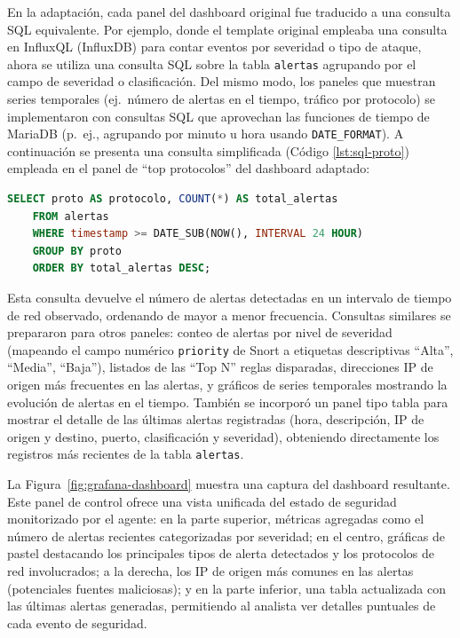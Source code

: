 \documentclass[11pt,a4paper,twoside]{report}
\begin{document}
En la adaptación, cada panel del dashboard original fue traducido a una consulta SQL equivalente. Por ejemplo, donde el template original empleaba una consulta en InfluxQL (InfluxDB) para contar eventos por severidad o tipo de ataque, ahora se utiliza una consulta SQL sobre la tabla \texttt{alertas} agrupando por el campo de severidad o clasificación. Del mismo modo, los paneles que muestran series temporales (ej.~número de alertas en el tiempo, tráfico por protocolo) se implementaron con consultas SQL que aprovechan las funciones de tiempo de MariaDB (p.~ej., agrupando por minuto u hora usando \texttt{DATE\_FORMAT}). A continuación se presenta una consulta simplificada (Código \ref{lst:sql-proto}) empleada en el panel de “top protocolos” del dashboard adaptado:

\begin{lstlisting}[language=SQL, caption={Consulta SQL (simplificada) para panel de protocolos en Grafana.}, label={lst:sql-proto}]
	SELECT proto AS protocolo, COUNT(*) AS total_alertas
	FROM alertas
	WHERE timestamp >= DATE_SUB(NOW(), INTERVAL 24 HOUR)
	GROUP BY proto
	ORDER BY total_alertas DESC;
\end{lstlisting}

Esta consulta devuelve el número de alertas detectadas en un intervalo de tiempo de red observado, ordenando de mayor a menor frecuencia. Consultas similares se prepararon para otros paneles: conteo de alertas por nivel de severidad (mapeando el campo numérico \texttt{priority} de Snort a etiquetas descriptivas “Alta”, “Media”, “Baja”), listados de las “Top N” reglas disparadas, direcciones IP de origen más frecuentes en las alertas, y gráficos de series temporales mostrando la evolución de alertas en el tiempo. También se incorporó un panel tipo tabla para mostrar el detalle de las últimas alertas registradas (hora, descripción, IP de origen y destino, puerto, clasificación y severidad), obteniendo directamente los registros más recientes de la tabla \texttt{alertas}.\newline

La Figura~\ref{fig:grafana-dashboard} muestra una captura del dashboard resultante. Este panel de control ofrece una vista unificada del estado de seguridad monitorizado por el agente: en la parte superior, métricas agregadas como el número de alertas recientes categorizadas por severidad; en el centro, gráficas de pastel destacando los principales tipos de alerta detectados y los protocolos de red involucrados; a la derecha, los IP de origen más comunes en las alertas (potenciales fuentes maliciosas); y en la parte inferior, una tabla actualizada con las últimas alertas generadas, permitiendo al analista ver detalles puntuales de cada evento de seguridad.\newline
\end{document}
